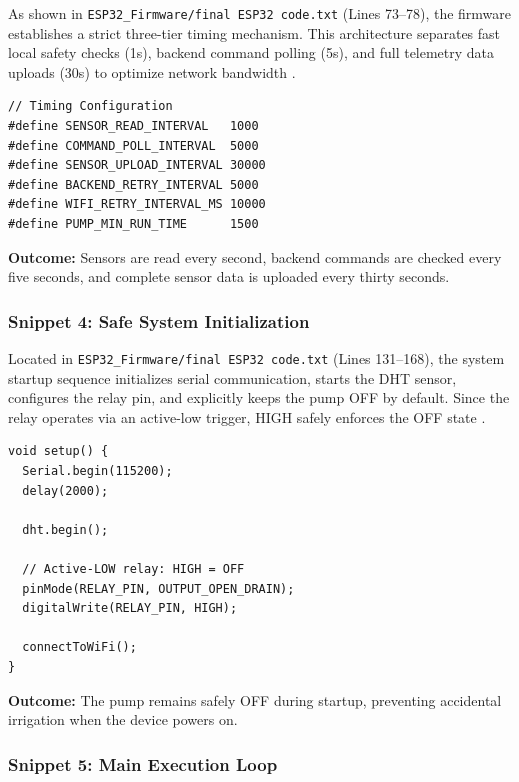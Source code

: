 As shown in \texttt{ESP32\_Firmware/final ESP32 code.txt} (Lines 73--78), the firmware establishes a strict three-tier timing mechanism. This architecture separates fast local safety checks (1s), backend command polling (5s), and full telemetry data uploads (30s) to optimize network bandwidth \cite{hassebo2024esp32}.

\begin{lstlisting}
// Timing Configuration
#define SENSOR_READ_INTERVAL   1000
#define COMMAND_POLL_INTERVAL  5000
#define SENSOR_UPLOAD_INTERVAL 30000
#define BACKEND_RETRY_INTERVAL 5000
#define WIFI_RETRY_INTERVAL_MS 10000
#define PUMP_MIN_RUN_TIME      1500
\end{lstlisting}

\textbf{Outcome:} Sensors are read every second, backend commands 
are checked every five seconds, and complete sensor data is 
uploaded every thirty seconds.

\subsubsection{Snippet 4: Safe System Initialization}
\label{subsec:snippet4}

Located in \texttt{ESP32\_Firmware/final ESP32 code.txt} (Lines 131--168), the system startup sequence initializes serial communication, starts 
the DHT sensor, configures the relay pin, and explicitly keeps the pump OFF 
by default. Since the relay operates via an active-low trigger, HIGH safely enforces the OFF state \cite{hassebo2024esp32}.

\begin{lstlisting}
void setup() {
  Serial.begin(115200);
  delay(2000);

  dht.begin();

  // Active-LOW relay: HIGH = OFF
  pinMode(RELAY_PIN, OUTPUT_OPEN_DRAIN);
  digitalWrite(RELAY_PIN, HIGH);

  connectToWiFi();
}
\end{lstlisting}

\textbf{Outcome:} The pump remains safely OFF during startup, 
preventing accidental irrigation when the device powers on.

\subsubsection{Snippet 5: Main Execution Loop}
\label{subsec:snippet5}

